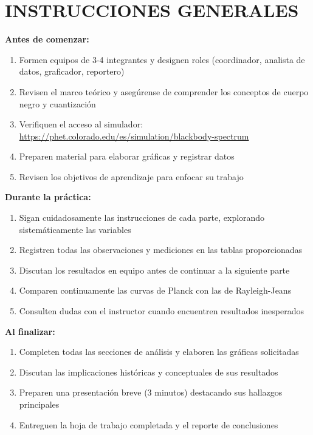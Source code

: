 \documentclass[12pt,a4paper]{article}
\begin{document}
	
	\section{INSTRUCCIONES GENERALES}
	
	\begin{instruccionbox}
		\textbf{Antes de comenzar:}
		\begin{enumerate}
			\item Formen equipos de 3-4 integrantes y designen roles (coordinador, analista de datos, graficador, reportero)
			\item Revisen el marco teórico y asegúrense de comprender los conceptos de cuerpo negro y cuantización
			\item Verifiquen el acceso al simulador: \url{https://phet.colorado.edu/es/simulation/blackbody-spectrum}
			\item Preparen material para elaborar gráficas y registrar datos
			\item Revisen los objetivos de aprendizaje para enfocar su trabajo
		\end{enumerate}
		
		\textbf{Durante la práctica:}
		\begin{enumerate}
			\item Sigan cuidadosamente las instrucciones de cada parte, explorando sistemáticamente las variables
			\item Registren todas las observaciones y mediciones en las tablas proporcionadas
			\item Discutan los resultados en equipo antes de continuar a la siguiente parte
			\item Comparen continuamente las curvas de Planck con las de Rayleigh-Jeans
			\item Consulten dudas con el instructor cuando encuentren resultados inesperados
		\end{enumerate}
		
		\textbf{Al finalizar:}
		\begin{enumerate}
			\item Completen todas las secciones de análisis y elaboren las gráficas solicitadas
			\item Discutan las implicaciones históricas y conceptuales de sus resultados
			\item Preparen una presentación breve (3 minutos) destacando sus hallazgos principales
			\item Entreguen la hoja de trabajo completada y el reporte de conclusiones
		\end{enumerate}
	\end{instruccionbox}
	
\end{document}

